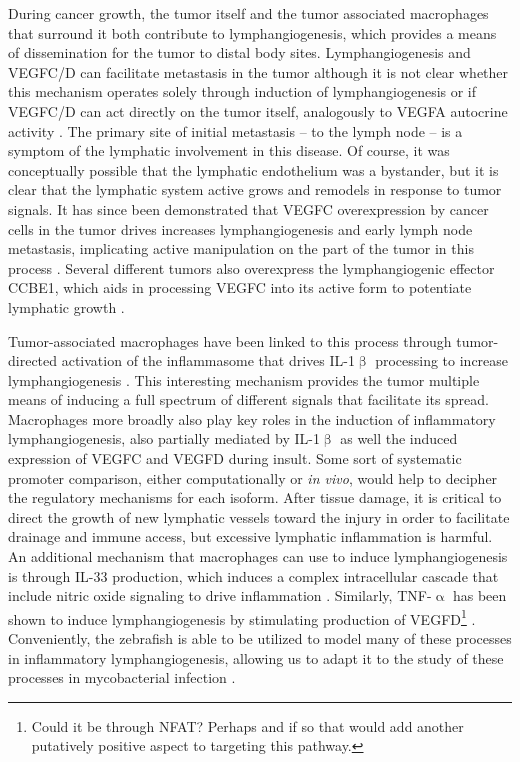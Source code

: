 During cancer growth, the tumor itself and the tumor associated macrophages that surround it both contribute to lymphangiogenesis, which provides a means of dissemination for the tumor to distal body sites. Lymphangiogenesis and VEGFC/D can facilitate metastasis in the tumor although it is not clear whether this mechanism operates solely through induction of lymphangiogenesis or if VEGFC/D can act directly on the tumor itself, analogously to VEGFA autocrine activity \citep{Stacker2014}. The primary site of initial metastasis -- to the lymph node -- is a symptom of the lymphatic involvement in this disease. Of course, it was conceptually possible that the lymphatic endothelium was a bystander, but it is clear that the lymphatic system active grows and remodels in response to tumor signals. It has since been demonstrated that VEGFC overexpression by cancer cells in the tumor drives increases lymphangiogenesis and early lymph node metastasis, implicating active manipulation on the part of the tumor in this process \citep{Duong2012}. Several different tumors also overexpress the lymphangiogenic effector CCBE1, which aids in processing VEGFC into its active form to potentiate lymphatic growth \citep{Hogan2009, LeGuen2014, Li2018b, Song2020, Zhao2018}.

Tumor\hyp{}associated macrophages have been linked to this process through tumor\hyp{}directed activation of the inflammasome that drives IL\hyp{}1$\upbeta$ processing to increase lymphangiogenesis \citep{Weichand2017}. This interesting mechanism provides the tumor multiple means of inducing a full spectrum of different signals that facilitate its spread. Macrophages more broadly also play key roles in the induction of inflammatory lymphangiogenesis, also partially mediated by IL\hyp{}1$\upbeta$ as well the induced expression of VEGFC and VEGFD during insult. Some sort of systematic promoter comparison, either computationally or \textit{in vivo}, would help to decipher the regulatory mechanisms for each isoform. After tissue damage, it is critical to direct the growth of new lymphatic vessels toward the injury in order to facilitate drainage and immune access, but excessive lymphatic inflammation is harmful. An additional mechanism that macrophages can use to induce lymphangiogenesis is through IL\hyp{}33 production, which induces a complex intracellular cascade that include nitric oxide signaling to drive inflammation \citep{Han2017}. Similarly, TNF\hyp{}$\upalpha$ has been shown to induce lymphangiogenesis by stimulating production of VEGFD\footnote{Could it be through NFAT? Perhaps and if so that would add another putatively positive aspect to targeting this pathway.} \citep{Hong2016}. Conveniently, the zebrafish is able to be utilized to model many of these processes in inflammatory lymphangiogenesis, allowing us to adapt it to the study of these processes in mycobacterial infection \citep{Okuda2015}.

